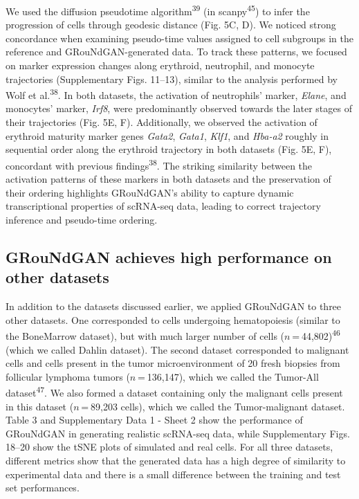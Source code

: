 We used the diffusion pseudotime algorithm\textsuperscript{39} (in scanpy\textsuperscript{45}) to infer the progression of cells through geodesic distance (Fig. 5C, D). We noticed strong concordance when examining pseudo-time values assigned to cell subgroups in the reference and GRouNdGAN-generated data. To track these patterns, we focused on marker expression changes along erythroid, neutrophil, and monocyte trajectories (Supplementary Figs. 11–13), similar to the analysis performed by Wolf et al.\textsuperscript{38}. In both datasets, the activation of neutrophils’ marker, \textit{Elane}, and monocytes’ marker, \textit{Irf8}, were predominantly observed towards the later stages of their trajectories (Fig. 5E, F). Additionally, we observed the activation of erythroid maturity marker genes \textit{Gata2}, \textit{Gata1}, \textit{Klf1}, and \textit{Hba-a2} roughly in sequential order along the erythroid trajectory in both datasets (Fig. 5E, F), concordant with previous findings\textsuperscript{38}. The striking similarity between the activation patterns of these markers in both datasets and the preservation of their ordering highlights GRouNdGAN’s ability to capture dynamic transcriptional properties of scRNA-seq data, leading to correct trajectory inference and pseudo-time ordering.

\subsection*{GRouNdGAN achieves high performance on other datasets}

In addition to the datasets discussed earlier, we applied GRouNdGAN to three other datasets. One corresponded to cells undergoing hematopoiesis (similar to the BoneMarrow dataset), but with much larger number of cells ($n$ = 44,802)\textsuperscript{46} (which we called Dahlin dataset). The second dataset corresponded to malignant cells and cells present in the tumor microenvironment of 20 fresh biopsies from follicular lymphoma tumors ($n$ = 136,147), which we called the Tumor-All dataset\textsuperscript{47}. We also formed a dataset containing only the malignant cells present in this dataset ($n$ = 89,203 cells), which we called the Tumor-malignant dataset. Table 3 and Supplementary Data 1 - Sheet 2 show the performance of GRouNdGAN in generating realistic scRNA-seq data, while Supplementary Figs. 18–20 show the tSNE plots of simulated and real cells. For all three datasets, different metrics show that the generated data has a high degree of similarity to experimental data and there is a small difference between the training and test set performances.

